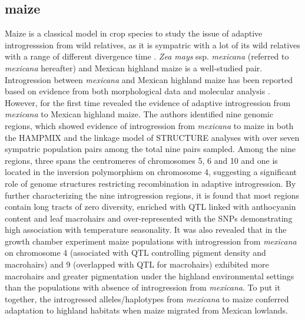 \documentclass[11pt]{article}
\begin{document}
\subsection{maize}
Maize is a classical model in crop species to study the issue of adaptive introgresssion from wild relatives, as it is sympatric with a lot of its wild relatives with a range of different divergence time \cite{hufford2013}.
\emph{Zea mays} ssp. \emph{mexicana} (referred to \emph{mexicana} hereafter) and Mexican highland maize is a well-studied pair.
Introgression between \emph{mexicana} and Mexican highland maize has been reported based on evidence from both morphological data \cite {wilkes1977, lauter2004, doebley1984} and molecular analysis \cite{matsuoka2002, vanHeerwaarden2011, doebley1987, warburton2011, fukunaga2005}.
However, \citep{hufford2013} for the first time revealed the evidence of adaptive introgression from \emph{mexicana} to Mexican highland maize.
The authors identified nine genomic regions, which showed evidence of introgression from \emph{mexicana} to maize in both the HAMPMIX and the linkage model of STRUCTURE analyses with over seven sympatric population pairs among the total nine pairs sampled. 
Among the nine regions, three spans the centromeres of chromosomes 5, 6 and 10 and one is located in the inversion polymorphism on chromosome 4, suggesting a significant role of genome structures restricting recombination in adaptive introgression.
By further characterizing the nine introgression regions, it is found that most regions contain long tracts of zero diversity, enriched with QTL linked with anthocyanin content and leaf macrohairs \cite{lauter2004} and over-represented with the SNPs demonstrating high association with temperature seasonality.
It was also revealed that in the growth chamber experiment maize populations with introgression from \emph{mexicana} on chromosome 4 (associated with QTL controlling pigment density and macrohairs) and 9 (overlapped with QTL for macrohairs) exhibited more macrohairs and greater pigmentation under the highland environmental settings than the populations with absence of introgression from \emph{mexicana}.
To put it together, the introgressed alleles/haplotypes from \emph{mexicana} to maize conferred adaptation to highland habitats when maize migrated from Mexican lowlands.
\end{document}
